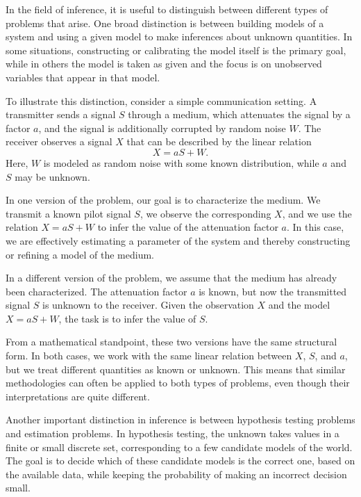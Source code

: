 In the field of inference, it is useful to distinguish between different types of problems that arise.  
One broad distinction is between building models of a system and using a given model to make inferences about unknown quantities.  
In some situations, constructing or calibrating the model itself is the primary goal, while in others the model is taken as given and the focus is on unobserved variables that appear in that model.  

To illustrate this distinction, consider a simple communication setting.  
A transmitter sends a signal \(S\) through a medium, which attenuates the signal by a factor \(a\), and the signal is additionally corrupted by random noise \(W\).  
The receiver observes a signal \(X\) that can be described by the linear relation
\[
X = aS + W.
\]
Here, \(W\) is modeled as random noise with some known distribution, while \(a\) and \(S\) may be unknown.  

In one version of the problem, our goal is to characterize the medium.  
We transmit a known pilot signal \(S\), we observe the corresponding \(X\), and we use the relation \(X = aS + W\) to infer the value of the attenuation factor \(a\).  
In this case, we are effectively estimating a parameter of the system and thereby constructing or refining a model of the medium.  

In a different version of the problem, we assume that the medium has already been characterized.  
The attenuation factor \(a\) is known, but now the transmitted signal \(S\) is unknown to the receiver.  
Given the observation \(X\) and the model \(X = aS + W\), the task is to infer the value of \(S\).  

From a mathematical standpoint, these two versions have the same structural form.  
In both cases, we work with the same linear relation between \(X\), \(S\), and \(a\), but we treat different quantities as known or unknown.  
This means that similar methodologies can often be applied to both types of problems, even though their interpretations are quite different.

Another important distinction in inference is between hypothesis testing problems and estimation problems.  
In hypothesis testing, the unknown takes values in a finite or small discrete set, corresponding to a few candidate models of the world.  
The goal is to decide which of these candidate models is the correct one, based on the available data, while keeping the probability of making an incorrect decision small.  


